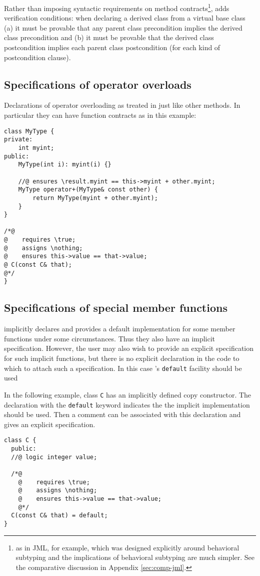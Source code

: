 Rather than imposing syntactic requirements on method contracts\footnote{as in JML, for example, which was designed explicitly around behavioral subtyping and the implications of behavioral subtyping are much simpler. 
	See the comparative discussion in Appendix \ref{sec:comp-jml}.},
\NAME adds verification conditions: when declaring a derived class from a virtual base class (a) it must be provable that any parent class precondition implies the derived class precondition and (b) it must be provable that the derived class postcondition implies each parent class postcondition (for each kind of postcondition clause). 


\subsection{Specifications of operator overloads}
Declarations of operator overloading as treated in \NAME just like other
methods. In particular they can have function contracts as in this example:
\begin{lstlisting}
class MyType {
private:
    int myint;
public:
    MyType(int i): myint(i) {}

    //@ ensures \result.myint == this->myint + other.myint;
    MyType operator+(MyType& const other) {
        return MyType(myint + other.myint);
    }
}

/*@
@    requires \true;
@    assigns \nothing;
@    ensures this->value == that->value;
@ C(const C& that);
@*/
}
\end{lstlisting}
\subsection{Specifications of special member functions}

\lang implicitly declares and provides a default implementation for some member functions under some circumstances. 
Thus they also have an implicit specification. However, the user may also wish to provide an explicit specification for such implicit functions, but there is no
explicit declaration in the \lang code to which to attach such a 
specification. In this case \lang's \lstinline|default| facility should be used

In the following example, class \lstinline|C| has an implicitly defined
copy constructor. The declaration with the \lstinline|default| keyword indicates
the the implicit implementation should be used.
Then a \NAME comment can be associated with this declaration and gives an explicit specification.
\begin{lstlisting}
class C {
  public:
  //@ logic integer value;
  
  /*@
    @    requires \true;
    @    assigns \nothing;
    @    ensures this->value == that->value;
    @*/
  C(const C& that) = default;
}
\end{lstlisting}


